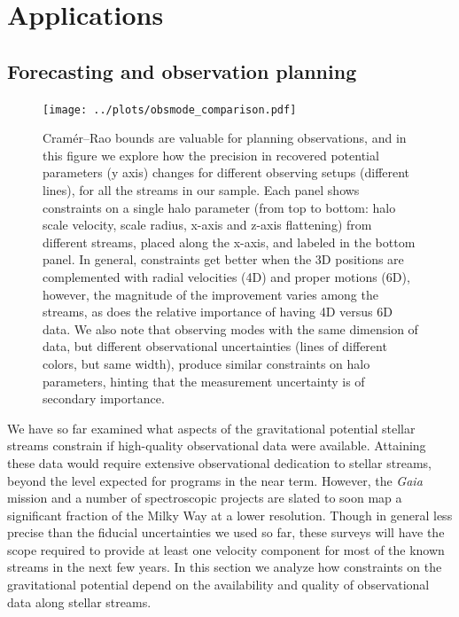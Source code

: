 \documentclass[modern]{aastex61}
\begin{document}

\section{Applications}
\label{sec:applications}

\subsection{Forecasting and observation planning}
\label{sec:forecast}
\begin{figure}
\begin{center}
\texttt{[image: ../plots/obsmode\_comparison.pdf]}
\caption{Cram\'er--Rao bounds are valuable for planning observations, and in this figure we explore how the precision in recovered potential parameters (y axis) changes for different observing setups (different lines), for all the streams in our sample.
Each panel shows constraints on a single halo parameter (from top to bottom: halo scale velocity, scale radius, x-axis and z-axis flattening) from different streams, placed along the x-axis, and labeled in the bottom panel.
In general, constraints get better when the 3D positions are complemented with radial velocities (4D) and proper motions (6D), however, the magnitude of the improvement varies among the streams, as does the relative importance of having 4D versus 6D data.
We also note that observing modes with the same dimension of data, but different observational uncertainties (lines of different colors, but same width), produce similar constraints on halo parameters, hinting that the measurement uncertainty is of secondary importance. 
}
\label{fig:obsmodes}
\end{center}
\end{figure}

We have so far examined what aspects of the gravitational potential stellar streams constrain if high-quality observational data were available.
Attaining these data would require extensive observational dedication to stellar streams, beyond the level expected for programs in the near term.
However, the \emph{Gaia} mission and a number of spectroscopic projects are slated to soon map a significant fraction of the Milky Way at a lower resolution.
Though in general less precise than the fiducial uncertainties we used so far, these surveys will have the scope required to provide at least one velocity component for most of the known streams in the next few years.
In this section we analyze how constraints on the gravitational potential depend on the availability and quality of observational data along stellar streams. 
\end{document}
